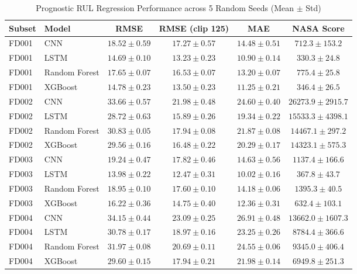 \begin{table}[t!]
\centering
\small
\caption{Prognostic RUL Regression Performance across 5 Random Seeds (Mean $\pm$ Std)}
\label{tab:rul_regression_summary}
\begin{tabular}{llcccc}
\toprule
\textbf{Subset} & \textbf{Model} & \textbf{RMSE} & \textbf{RMSE (clip 125)} & \textbf{MAE} & \textbf{NASA Score} \\
\midrule
FD001 & CNN & $18.52 \pm 0.59$ & $17.27 \pm 0.57$ & $14.48 \pm 0.51$ & $712.3 \pm 153.2$ \\
FD001 & LSTM & $14.69 \pm 0.10$ & $13.23 \pm 0.23$ & $10.90 \pm 0.14$ & $330.3 \pm 24.8$ \\
FD001 & Random Forest & $17.65 \pm 0.07$ & $16.53 \pm 0.07$ & $13.20 \pm 0.07$ & $775.4 \pm 25.8$ \\
FD001 & XGBoost & $14.78 \pm 0.23$ & $13.50 \pm 0.23$ & $11.25 \pm 0.21$ & $346.4 \pm 26.5$ \\
\midrule
FD002 & CNN & $33.66 \pm 0.57$ & $21.98 \pm 0.48$ & $24.60 \pm 0.40$ & $26273.9 \pm 2915.7$ \\
FD002 & LSTM & $28.72 \pm 0.63$ & $15.89 \pm 0.26$ & $19.34 \pm 0.22$ & $15533.3 \pm 4398.1$ \\
FD002 & Random Forest & $30.83 \pm 0.05$ & $17.94 \pm 0.08$ & $21.87 \pm 0.08$ & $14467.1 \pm 297.2$ \\
FD002 & XGBoost & $29.56 \pm 0.16$ & $16.48 \pm 0.22$ & $20.29 \pm 0.17$ & $14323.1 \pm 575.3$ \\
\midrule
FD003 & CNN & $19.24 \pm 0.47$ & $17.82 \pm 0.46$ & $14.63 \pm 0.56$ & $1137.4 \pm 166.6$ \\
FD003 & LSTM & $13.98 \pm 0.22$ & $12.47 \pm 0.31$ & $10.02 \pm 0.16$ & $367.8 \pm 43.7$ \\
FD003 & Random Forest & $18.95 \pm 0.10$ & $17.60 \pm 0.10$ & $14.18 \pm 0.06$ & $1395.3 \pm 40.5$ \\
FD003 & XGBoost & $16.22 \pm 0.36$ & $14.75 \pm 0.40$ & $12.36 \pm 0.31$ & $632.4 \pm 103.1$ \\
\midrule
FD004 & CNN & $34.15 \pm 0.44$ & $23.09 \pm 0.25$ & $26.91 \pm 0.48$ & $13662.0 \pm 1607.3$ \\
FD004 & LSTM & $30.78 \pm 0.17$ & $18.97 \pm 0.16$ & $23.25 \pm 0.26$ & $8784.4 \pm 366.6$ \\
FD004 & Random Forest & $31.97 \pm 0.08$ & $20.69 \pm 0.11$ & $24.55 \pm 0.06$ & $9345.0 \pm 406.4$ \\
FD004 & XGBoost & $29.60 \pm 0.15$ & $17.94 \pm 0.21$ & $21.98 \pm 0.14$ & $6949.8 \pm 251.3$ \\
\bottomrule
\end{tabular}
\end{table}

